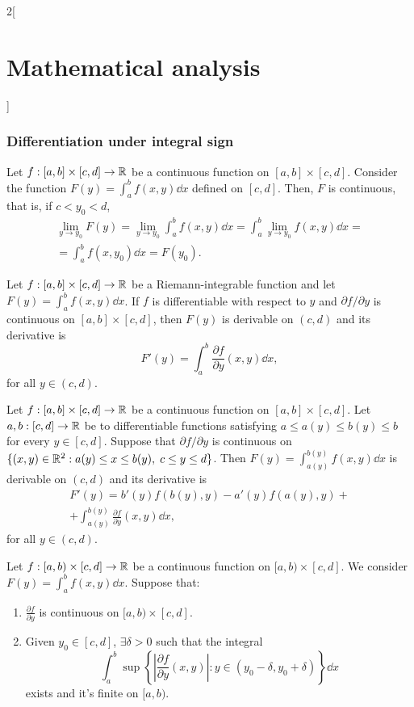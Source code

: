 \documentclass[../../../main.tex]{subfiles}
\begin{document}
\begin{multicols}{2}[\section{Mathematical analysis}]
  \subsubsection{Differentiation under integral sign}
  \begin{theorem}
    Let $f:[a,b]\times[c,d]\rightarrow\mathbb{R} $ be a continuous function on $[a,b]\times[c,d]$. Consider the function $\displaystyle F(y)=\int_a^bf(x,y)\dd x$ defined on $[c,d]$. Then, $F$ is continuous, that is, if $c<y_0<d$, \begin{multline*}
      \lim_{y\to y_0}F(y)=\lim_{y\to y_0}\int_a^bf(x,y)\dd x=\int_a^b\lim_{y\to y_0}f(x,y)\dd x=\\=\int_a^bf(x,y_0)\dd x=F(y_0).
    \end{multline*}
  \end{theorem}
  \begin{theorem}
    Let $f:[a,b]\times[c,d]\rightarrow\mathbb{R} $ be a Riemann-integrable function and let $\displaystyle F(y)=\int_a^bf(x,y)\dd x$. If $f$ is differentiable with respect to $y$ and $\partial f/\partial y$ is continuous on $[a,b]\times[c,d]$, then $F(y)$ is derivable on $(c,d)$ and its derivative is $$F'(y)=\int_a^b\frac{\partial f}{\partial y}(x,y)\dd x,$$ for all $y\in(c,d)$.
  \end{theorem}
  \begin{theorem}
    Let $f:[a,b]\times[c,d]\rightarrow\mathbb{R} $ be a continuous function on $[a,b]\times[c,d]$. Let $a,b:[c,d]\rightarrow\mathbb{R} $ be to differentiable functions satisfying $a\leq a(y)\leq b(y)\leq b$ for every $y\in[c,d]$. Suppose that $\partial f/\partial y$ is continuous on $\{(x,y)\in\mathbb{R} ^2:a(y)\leq x\leq b(y),\; c\leq y\leq d\}$. Then $\displaystyle F(y)=\int_{a(y)}^{b(y)}f(x,y)\dd x$ is derivable on $(c,d)$ and its derivative is \begin{multline*}
      F'(y)=b'(y)f(b(y),y)-a'(y)f(a(y),y)+\\+\int_{a(y)}^{b(y)}\frac{\partial f}{\partial y}(x,y)\dd x,
    \end{multline*} for all $y\in(c,d)$.
  \end{theorem}
  \begin{theorem}
    Let $f:[a,b)\times[c,d]\rightarrow\mathbb{R} $ be a continuous function on $[a,b)\times[c,d]$. We consider $\displaystyle F(y)=\int_a^bf(x,y)\dd x$. Suppose that:
    \begin{enumerate}
      \item $\displaystyle\frac{\partial f}{\partial y}$ is continuous on $[a,b)\times[c,d]$.
      \item Given $y_0\in[c,d]$, $\exists\delta>0$ such that the integral $$\int_a^b\sup\left\{\left|\frac{\partial f}{\partial y}(x,y)\right|:y\in(y_0-\delta,y_0+\delta)\right\}\dd x$$ exists and it's finite on $[a,b)$.

\end{enumerate}
\end{theorem}
\end{multicols}
\end{document}
